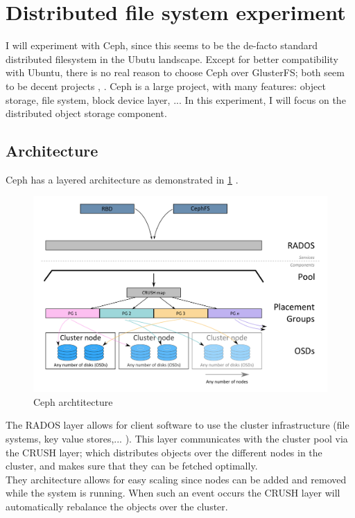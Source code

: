 \documentclass[12pt]{report}
\begin{document}
\section{Distributed file system experiment}
I will experiment with Ceph, since this seems to be the de-facto
standard distributed filesystem in the Ubutu landscape.
Except for better compatibility with Ubuntu, there is no real reason
to choose Ceph over GlusterFS; both seem to be decent projects
\cite{ceph_vs_gluster_1}, \cite{ceph_vs_gluster_debate}.
Ceph is a large project, with many features: object storage, file
system, block device layer, ... In this experiment, I will focus on
the distributed object storage component.

\subsection{Architecture}
\label{subsec:ceph_architecture}
Ceph has a layered architecture as demonstrated in
\ref{fig:ceph_architecture} \cite{ceph_architecture}.

\begin{figure}[h!]
  \caption{Ceph archtitecture}
  \label{fig:ceph_architecture}
  \centering
    \includegraphics[scale=0.3]{pics/ceph_architecture.png}
\end{figure}

The RADOS layer allows for client software to use the cluster
infrastructure  (file systems, key value stores,... ). This layer
communicates with the cluster pool via the CRUSH layer; which
distributes objects over the different nodes in the cluster, and makes
sure that they can be fetched optimally. \\
They architecture allows for easy scaling since nodes can be added and
removed while the system is running. When such an event occurs the
CRUSH layer will automatically rebalance the objects over the cluster.
\end{document}
